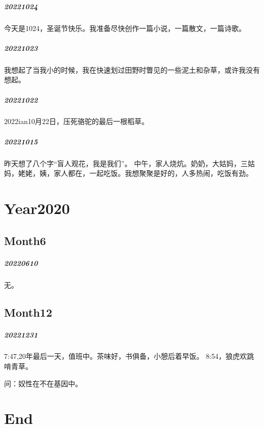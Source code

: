\documentclass[UTF8]{Diaries}
\begin{document}
\paragraph{20221024}
今天是1024，圣诞节快乐。我准备尽快创作一篇小说，一篇散文，一篇诗歌。

\paragraph{20221023}
我想起了当我小的时候，我在快速划过田野时瞥见的一些泥土和杂草，或许我没有想起。

\paragraph{20221022}
2022ian10月22日，压死骆驼的最后一根稻草。

\paragraph{20221015}
昨天想了八个字“盲人观花，我是我们”。
中午，家人烧炕。奶奶，大姑妈，三姑妈，姥姥，姨，家人都在，一起吃饭。我想聚聚是好的，人多热闹，吃饭有劲。


\chapter{Year2020}
\section{Month6}
\paragraph{20220610}

无。

\section{Month12}
\paragraph{20221231}

7:47,20年最后一天，值班中。茶味好，书俱备，小憩后着早饭。
8:54，狼虎欢跳啃青草。

问：奴性在不在基因中。

\chapter{End}
\end{document}
